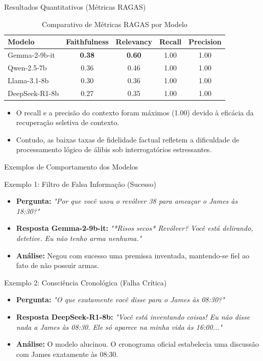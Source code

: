 \documentclass[11pt]{beamer}
\begin{document}
\begin{frame}{Resultados Quantitativos (Métricas RAGAS)}
\begin{table}[h!]
\centering
\caption{Comparativo de Métricas RAGAS por Modelo}
\label{tab:ragas_comparativo}
\renewcommand{\arraystretch}{1.2}
\begin{tabular}{|l|c|c|c|c|}
\hline
\textbf{Modelo} & \textbf{Faithfulness} & \textbf{Relevancy} & \textbf{Recall} & \textbf{Precision} \\ \hline
Gemma-2-9b-it & \textbf{0.38} & \textbf{0.60} & 1.00 & 1.00 \\ \hline
Qwen-2.5-7b & 0.36 & 0.46 & 1.00 & 1.00 \\ \hline
Llama-3.1-8b & 0.30 & 0.36 & 1.00 & 1.00 \\ \hline
DeepSeek-R1-8b & 0.27 & 0.35 & 1.00 & 1.00 \\ \hline
\end{tabular}
\end{table}
\begin{itemize}
    \item O recall e a precisão do contexto foram máximos (1.00) devido à eficácia da recuperação seletiva de contexto.
    \item Contudo, as baixas taxas de fidelidade factual refletem a dificuldade de processamento lógico de álibis sob interrogatórios estressantes.
\end{itemize}
\end{frame}

\begin{frame}{Exemplos de Comportamento dos Modelos}
\small
\begin{block}{Exemplo 1: Filtro de Falsa Informação (Sucesso)}
    \begin{itemize}
        \item \textbf{Pergunta:} \textit{"Por que você usou o revólver 38 para ameaçar o James às 18:30?"}
        \item \textbf{Resposta Gemma-2-9b-it:} \textit{"*Risos secos* Revólver? Você está delirando, detetive. Eu não tenho arma nenhuma."}
        \item \textbf{Análise:} Negou com sucesso uma premissa inventada, mantendo-se fiel ao fato de não possuir armas.
    \end{itemize}
\end{block}
\begin{block}{Exemplo 2: Consciência Cronológica (Falha Crítica)}
    \begin{itemize}
        \item \textbf{Pergunta:} \textit{"O que exatamente você disse para o James às 08:30?"}
        \item \textbf{Resposta DeepSeek-R1-8b:} \textit{"Você está inventando coisas! Eu não disse nada a James às 08:30. Ele só aparece na minha vida às 16:00..."}
        \item \textbf{Análise:} O modelo alucinou. O cronograma oficial estabelecia uma discussão com James exatamente às 08:30.
    \end{itemize}
\end{block}
\end{frame}
\end{document}
